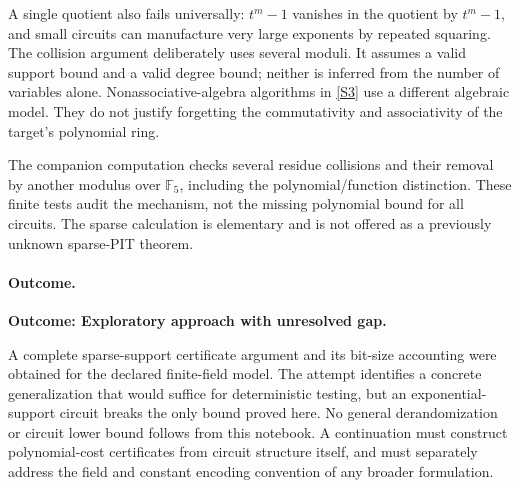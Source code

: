 \documentclass[11pt,a4paper]{article}
\numberwithin{equation}{section}
\newcommand{\F}{\mathbb{F}}
\newcommand{\sref}[2]{\hyperlink{source:#1:#2}{[S#2]}}
\begin{document}
A single quotient also fails universally: $t^m-1$ vanishes in the quotient
by $t^m-1$, and small circuits can manufacture very large exponents by
repeated squaring. The collision argument deliberately uses several
moduli. It assumes a valid support bound and a valid degree bound; neither
is inferred from the number of variables alone. Nonassociative-algebra
algorithms in \sref{statement}{3} use a different algebraic model. They do not
justify forgetting the commutativity and associativity of the target's
polynomial ring.

The companion computation checks several residue collisions and their
removal by another modulus over $\F_5$, including the polynomial/function
distinction. These finite tests audit the mechanism, not the missing
polynomial bound for all circuits. The sparse calculation is elementary
and is not offered as a previously unknown sparse-PIT theorem.

\paragraph{Outcome.}
\textbf{Outcome: Exploratory approach with unresolved gap.}

A complete sparse-support certificate argument and its bit-size accounting
were obtained for the declared finite-field model. The attempt identifies
a concrete generalization that would suffice for deterministic testing,
but an exponential-support circuit breaks the only bound proved here.
No general derandomization or circuit lower bound follows from this notebook.
A continuation must construct polynomial-cost certificates from circuit
structure itself, and must separately address the field and constant
encoding convention of any broader formulation.

\needspace{170mm}
\end{document}
